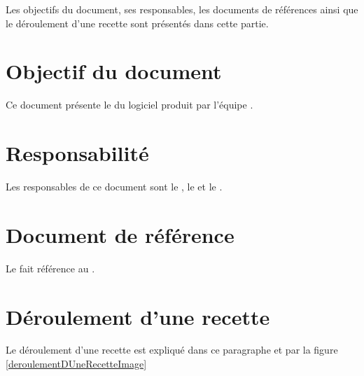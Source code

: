 	
	Les objectifs du document, ses responsables, les documents de références ainsi que le déroulement d'une recette sont présentés dans cette partie.

\section{Objectif du document}
	Ce document présente le \PTV du logiciel produit par l'équipe \nomEquipe{}.
	
\section{Responsabilité}
	Les responsables de ce document sont le \CP, le \RQ{} et le \RD.
	
\section{Document de référence}
	Le \PTV fait référence au \DSE.
	
\section{Déroulement d'une recette}
Le déroulement d'une recette est expliqué dans ce paragraphe et par la figure \ref{deroulementDUneRecetteImage} \\


